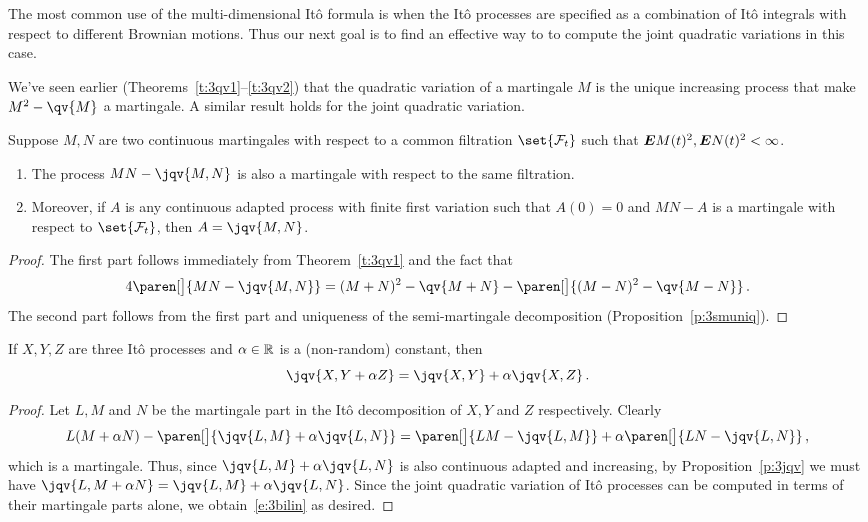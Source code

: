 The most common use of the multi-dimensional It\^o formula is when the It\^o processes are specified as a combination of It\^o integrals with respect to different Brownian motions.
Thus our next goal is to find an effective way to to compute the joint quadratic variations in this case.

We've seen earlier (Theorems~\ref{t:3qv1}--\ref{t:3qv2}) that the quadratic variation of a martingale $M$ is the unique increasing process that make $M^2 - \qv{M}$ a martingale.
A similar result holds for the joint quadratic variation.
\begin{proposition}\label{p:3jqv}
  Suppose $M, N$ are two continuous martingales with respect to a common filtration $\set{\mathcal F_t}$ such that $\bm{E} M(t)^2, \bm{E} N(t)^2 < \infty$.
  \begin{enumerate}
    \item
      The process $MN - \jqv{M,N}$ is also a martingale with respect to the same filtration.
    \item
      Moreover, if $A$ is any continuous adapted process with finite first variation such that $A(0) = 0$ and $MN - A$ is a martingale with respect to $\set{\mathcal F_t}$, then $A = \jqv{M,N}$.
  \end{enumerate}
\end{proposition}
\begin{proof}
  The first part follows immediately from Theorem~\ref{t:3qv1} and the fact that
  \begin{equation*}
    4 \paren[\big]{ MN - \jqv{M,N} }
      = (M+N)^2 - \qv{M+N} - \paren[\big]{(M-N)^2 - \qv{M-N}}\,.
  \end{equation*}
  The second part follows from the first part and uniqueness of the semi-martingale decomposition (Proposition~\ref{p:3smuniq}).
\end{proof}
\begin{proposition}[Bi-linearity]
  If $X, Y, Z$ are three It\^o processes and $\alpha \in \mathbb{R}$ is a (non-random) constant, then
  \begin{equation}\label{e:3bilin}
    \jqv{X, Y + \alpha Z} = \jqv{X,Y} + \alpha \jqv{X, Z}\,.
  \end{equation}
\end{proposition}
\begin{proof}
  Let $L, M$ and $N$ be the martingale part in the It\^o decomposition of $X, Y$ and $Z$ respectively.
  Clearly
  \begin{equation*}
    L(M + \alpha N) - \paren[\big]{ \jqv{L, M} + \alpha \jqv{L,N} }
      = \paren[\big]{LM - \jqv{L,M}} + \alpha \paren[\big]{ L N - \jqv{L,N}}\,,
  \end{equation*}
  which is a martingale.
  Thus, since $\jqv{L, M} + \alpha \jqv{L,N}$ is also continuous adapted and increasing, by Proposition~\ref{p:3jqv} we must have $\jqv{L, M + \alpha N} = \jqv{L, M} + \alpha \jqv{L,N}$.
  Since the joint quadratic variation of It\^o processes can be computed in terms of their martingale parts alone, we obtain~\eqref{e:3bilin} as desired.
\end{proof}

